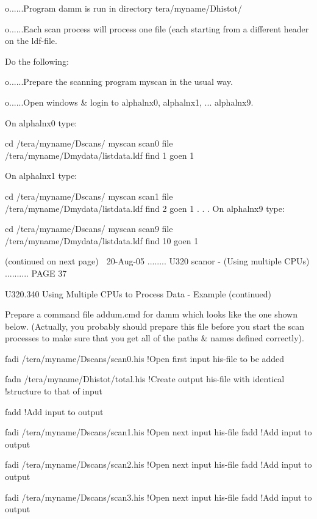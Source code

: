    o......Program damm is run in directory tera/myname/Dhistot/
 
   o......Each scan process will  process  one  file  (each  starting  from  a
          different header on the ldf-file.
 
   Do the following:
 
   o......Prepare the scanning program myscan in the usual way.
 
   o......Open windows & login to alphalnx0, alphalnx1, ... alphalnx9.
 
   On alphalnx0 type:
 
   cd /tera/myname/Dscans/
   myscan scan0
   file /tera/myname/Dmydata/listdata.ldf
   find 1
   goen 1
 
   On alphalnx1 type:
 
   cd /tera/myname/Dscans/
   myscan scan1
   file /tera/myname/Dmydata/listdata.ldf
   find 2
   goen 1
   .
   .
   .
   On alphalnx9 type:
 
   cd /tera/myname/Dscans/
   myscan scan9
   file /tera/myname/Dmydata/listdata.ldf
   find 10
   goen 1
 
 
                            (continued on next page)
    
   20-Aug-05 ........ U320  scanor - (Using multiple CPUs) .......... PAGE  37
 
 
   U320.340  Using Multiple CPUs to Process Data - Example (continued)
 
   Prepare  a  command  file addum.cmd for damm which looks like the one shown
   below. (Actually, you probably should prepare this file  before  you  start
   the  scan  processes  to  make  sure  that you get all of the paths & names
   defined correctly).
 
   fadi /tera/myname/Dscans/scan0.his    !Open first input his-file to be added
 
   fadn /tera/myname/Dhistot/total.his   !Create output his-file with identical
                                         !structure to that of input
 
   fadd                                  !Add input to output
 
   fadi /tera/myname/Dscans/scan1.his    !Open next input his-file
   fadd                                  !Add input to output
 
   fadi /tera/myname/Dscans/scan2.his    !Open next input his-file
   fadd                                  !Add input to output
 
   fadi /tera/myname/Dscans/scan3.his    !Open next input his-file
   fadd                                  !Add input to output
 
